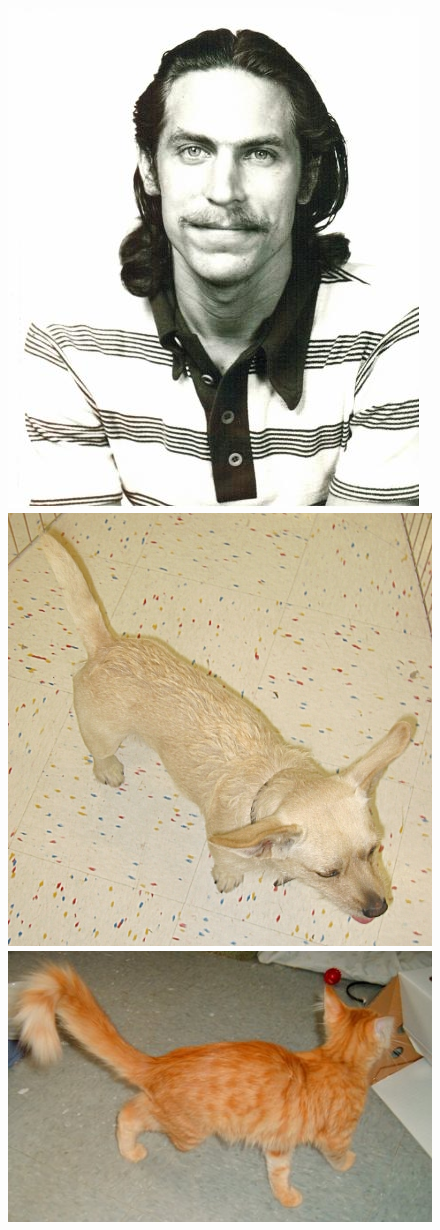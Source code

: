 \documentclass[12pt]{article}
\begin{document}
\begin{figure}[H] \center
\includegraphics[scale=.25]{hard/3577.jpg} 
\includegraphics[scale=.25]{hard/3989.jpg} 
\includegraphics[scale=.50]{hard/4202.jpg} 

\end{figure}
\end{document}
